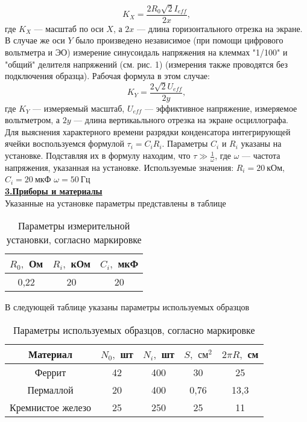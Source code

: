 \documentclass[12pt, letterpaper, oneside]{article}
\begin{document}
\begin{equation}\label{K_X_formula}
K_X = \frac{2R_0\sqrt{2}I_{eff}}{2x},
\end{equation}
где $K_X$ — масштаб по оси $X$, а $2x$ — длина горизонтального отрезка на экране.
В случае же оси $Y$ было произведено независимое (при помощи цифрового вольтметра и ЭО) измерение синусоидаль напряжения на клеммах "1/100" и "общий" делителя напряжений (см. рис. 1) (измерения также проводятся без подключения образца). Рабочая формула в этом случае:
\begin{equation}\label{K_X_formula}
K_Y = \frac{2\sqrt{2}U_{eff}}{2y},
\end{equation}
где $K_Y$ — измеряемый масштаб, $U_{eff}$ — эффиктивное напряжение, измеряемое вольтметром, а $2y$ — длина вертикаьльного отрезка на экране осциллографа.\\
Для выяснения характерного времени разрядки конденсатора интегрирующей ячейки воспользуемся формулой $\tau_i = C_iR_i$. Параметры $C_i$ и $R_i$ указаны на установке. Подставляя их в формулу находим, что $\tau ≫ \frac{1}{\omega}$, где $\omega$ — частота напряжения, указанная на установке. Используемые значения: $R_i = 20\ кОм$, $C_i = 20\ мкФ$ $\omega = 50\ Гц$\\
\textbf{\underline{3.Приборы и материалы}}\\
Указанные на установке параметры представлены в таблице\\
\begin{table}[H]
\centering
\caption{Параметры измерительной установки, согласно маркировке}
\begin{tabular}{|c|c|c|}
\hline
$R_0,$ Ом & $R_i,$ кОм & $C_i,$ мкФ\\
\hline
0,22 & 20 & 20\\
\hline
\end{tabular}
\end{table}
В следующей таблице указаны параметры используемых образцов\\
\begin{table}[H]
\centering
\caption{Параметры используемых образцов, согласно маркировке}
\begin{tabular}{|c|c|c|c|c|}
\hline
Материал & $N_0,$ шт & $N_i,$ шт & $S,$ $см^2$ & $2\pi R,$ см\\
\hline
Феррит & 42 & 400 & 30 & 25\\
\hline
Пермаллой & 20 & 400 & 0,76 & 13,3\\
\hline
Кремнистое железо & 25 & 250 & 25 & 11\\
\hline
\end{tabular}
\end{table}
\end{document}
